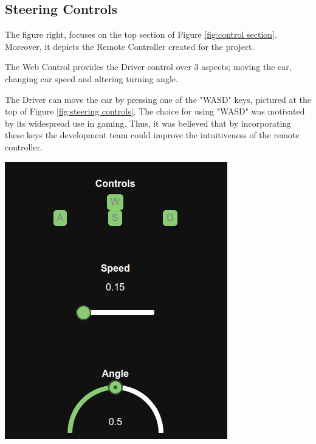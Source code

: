 \documentclass[12pt]{article}
\begin{document}
\subsection{Steering Controls} \label{subsec:steering controls}
\noindent
\begin{minipage}[t]{0.49\textwidth}
    \vspace{0pt} 
    \setlength{\parindent}{20pt}
	The figure right, focuses on the top section of Figure \ref{fig:control section}. Moreover, it depicts the Remote Controller created for the project. \par
    The Web Control provides the Driver control over 3 aspects; moving the car, changing car speed and altering turning angle. \par
    The Driver can move the car by pressing one of the "WASD" keys, pictured at the top of Figure \ref{fig:steering controls}. The choice for using "WASD" was motivated by its widespread use in gaming. Thus, it was believed that by incorporating these keys the development team could improve the intuitiveness of the remote controller. \par %
\end{minipage}%
\hspace{0.02\textwidth} %
\begin{minipage}[t]{0.49\textwidth}
    \vspace{0pt}
   \includegraphics[width=\linewidth]{Images/steering_control.png}
	\label{fig:steering controls}  
\end{minipage}%
\vspace{0.5cm} %
\end{document}
